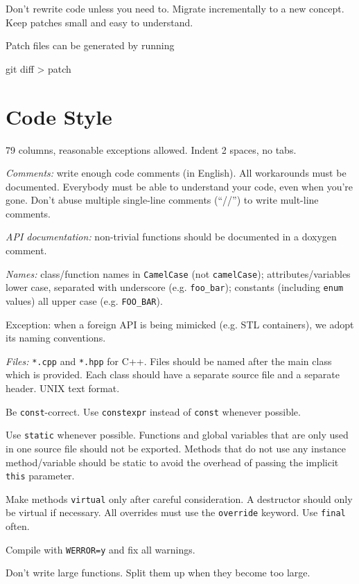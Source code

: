 \documentclass[a4paper,12pt]{refrep}
\begin{document}
Don't rewrite code unless you need to.  Migrate incrementally to a new
concept.  Keep patches small and easy to understand.

Patch files can be generated by running
\begin{verbatim*}
git diff > patch
\end{verbatim*}

\section{Code Style}

79 columns, reasonable exceptions allowed.  Indent 2 spaces, no tabs.

\emph{Comments:} write enough code comments (in English).  All
workarounds must be documented.  Everybody must be able to understand
your code, even when you're gone.  Don't abuse multiple single-line
comments (``//'') to write mult-line comments.

\emph{API documentation:} non-trivial functions should be documented
in a doxygen comment.

\emph{Names:} class/function names in \texttt{CamelCase} (not
\texttt{camelCase}); attributes/variables lower case, separated with
underscore (e.g. \texttt{foo\_bar}); constants (including
\texttt{enum} values) all upper case (e.g. \texttt{FOO\_BAR}).

Exception: when a foreign API is being mimicked (e.g. STL containers),
we adopt its naming conventions.

\emph{Files:} \texttt{*.cpp} and \texttt{*.hpp} for C++.  Files should
be named after the main class which is provided.  Each class should
have a separate source file and a separate header.  UNIX text format.

Be \texttt{const}-correct.  Use \verb|constexpr| instead of
\verb|const| whenever possible.

Use \verb|static| whenever possible.  Functions and global variables
that are only used in one source file should not be exported.  Methods
that do not use any instance method/variable should be static to avoid
the overhead of passing the implicit \verb|this| parameter.

Make methods \verb|virtual| only after careful consideration.  A
destructor should only be virtual if necessary.  All overrides must
use the \verb|override| keyword.  Use \verb|final| often.

Compile with \texttt{WERROR=y} and fix all warnings.

Don't write large functions.  Split them up when they become too
large.
\end{document}
